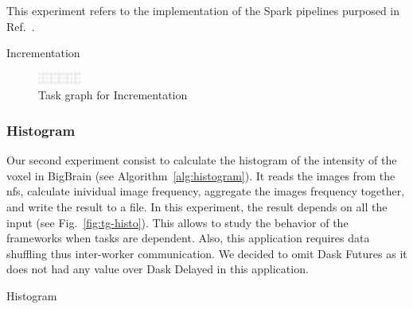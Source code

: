 \documentclass[conference]{IEEEtran}
\begin{document}
This experiment refers to the implementation of the Spark pipelines purposed
in Ref.~\cite{Hayot-Sasson:17}.

\begin{algorithm}[!b]
    \caption{Incrementation}\label{alg:incrementation}
    \begin{algorithmic}
        \EndFor
    \EndFor
\end{algorithmic}
\end{algorithm}

\begin{figure}[!b]
    \centering
    \includegraphics[width=0.125\textwidth,
    angle=-90]{images/incrementation-task-graph.png}
    \caption{Task graph for Incrementation}\label{fig:tg-inc}
\end{figure}

\subsubsection{\textbf{Histogram}}
Our second experiment consist to calculate the histogram of the intensity of the
voxel in BigBrain (see Algorithm~\ref{alg:histogram}). It reads the images from the
nfs, calculate inividual image frequency, aggregate the images frequency together,
and write the result to a file. In this experiment, the result depends on all the
input (see Fig.~\ref{fig:tg-histo}). This allows to study the behavior of the
frameworks when tasks are dependent. Also, this application requires data shuffling
thus inter-worker communication. We decided to omit Dask Futures as it does not had
any value over Dask Delayed in this application.

\begin{algorithm}[!t]
    \caption{Histogram}\label{alg:histogram}
    \begin{algorithmic}
    \EndFor
    

    \end{algorithmic}
\end{algorithm}
\end{document}
